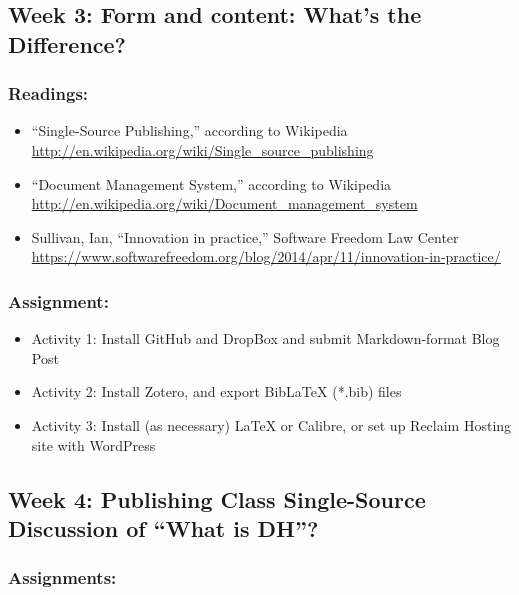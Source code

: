\documentclass[]{article}
\begin{document}
\subsection{Week 3: Form and content: What's the
Difference?}\label{week-3-form-and-content-whats-the-difference}

\subsubsection{Readings:}\label{readings-2}

\begin{itemize}
\itemsep1pt\parskip0pt
\item
  ``Single-Source Publishing,'' according to Wikipedia
  \url{http://en.wikipedia.org/wiki/Single_source_publishing}
\item
  ``Document Management System,'' according to Wikipedia
  \url{http://en.wikipedia.org/wiki/Document_management_system}
\item
  Sullivan, Ian, ``Innovation in practice,'' Software Freedom Law Center
  \url{https://www.softwarefreedom.org/blog/2014/apr/11/innovation-in-practice/}
\end{itemize}

\subsubsection{Assignment:}\label{assignment-2}

\begin{itemize}
\itemsep1pt\parskip0pt
\item
  Activity 1: Install GitHub and DropBox and submit Markdown-format Blog
  Post
\item
  Activity 2: Install Zotero, and export BibLaTeX (*.bib) files
\item
  Activity 3: Install (as necessary) LaTeX or Calibre, or set up Reclaim
  Hosting site with WordPress
\end{itemize}

\subsection{Week 4: Publishing Class Single-Source Discussion of ``What
is
DH''?}\label{week-4-publishing-class-single-source-discussion-of-what-is-dh}

\subsubsection{Assignments:}\label{assignments}
\end{document}
